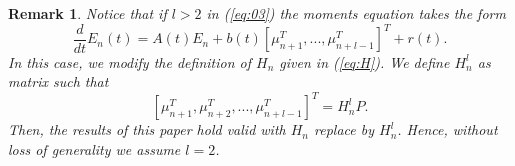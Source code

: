 \documentclass[letterpaper, 10 pt, conference]{ieeeconf}
\newtheorem{remark}[theorem]{Remark}
\begin{document}
\begin{remark}
Notice that if $l>2$ in (\ref{eq:03}) the moments equation takes the form%
\begin{equation*}
\frac{d}{dt}E_{n}\left( t\right) =A\left( t\right) E_{n}+b\left( t\right) %
\left[ \mu _{n+1}^{T},...,\mu _{n+l-1}^{T}\right] ^{T}+r\left( t\right) .
\end{equation*}%
In this case, we modify the definition of $H_{n}$ given in (\ref{eq:H}). We
define $H_{n}^{l}$ as matrix such that%
\begin{equation*}
\left[ \mu _{n+1}^{T},\mu _{n+2}^{T},...,\mu _{n+l-1}^{T}\right]
^{T}=H_{n}^{l}P.
\end{equation*}%
Then, the results of this paper hold valid with $H_{n}$ replace by $%
H_{n}^{l} $. Hence, without loss of generality we assume $l=2$.
\end{remark}
\end{document}
